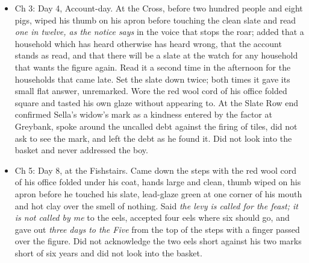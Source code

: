 \documentclass{design/chronicle}
\begin{document}
{
\begin{itemize}[leftmargin=1.4em,itemsep=1pt,topsep=3pt,parsep=0pt]

\item Ch 3: Day 4, Account-day. At the Cross, before two hundred people and eight pigs, wiped his thumb on his apron before touching the clean slate and read \emph{one in twelve, as the notice says} in the voice that stops the roar; added that a household which has heard otherwise has heard wrong, that the account stands as read, and that there will be a slate at the watch for any household that wants the figure again. Read it a second time in the afternoon for the households that came late. Set the slate down twice; both times it gave its small flat answer, unremarked. Wore the red wool cord of his office folded square and tasted his own glaze without appearing to. At the Slate Row end confirmed Sella’s widow’s mark as a kindness entered by the factor at Greybank, spoke around the uncalled debt against the firing of tiles, did not ask to see the mark, and left the debt as he found it. Did not look into the basket and never addressed the boy.

\end{itemize}

\begin{itemize}[leftmargin=1.4em,itemsep=1pt,topsep=3pt,parsep=0pt]

\item Ch 5: Day 8, at the Fishstairs. Came down the steps with the red wool cord of his office folded under his coat, hands large and clean, thumb wiped on his apron before he touched his slate, lead-glaze green at one corner of his mouth and hot clay over the smell of nothing. Said \emph{the levy is called for the feast; it is not called by me} to the eels, accepted four eels where six should go, and gave out \emph{three days to the Five} from the top of the steps with a finger passed over the figure. Did not acknowledge the two eels short against his two marks short of six years and did not look into the basket.

\end{itemize}

\begin{itemize}[leftmargin=1.4em,itemsep=1pt,topsep=3pt,parsep=0pt]


\end{itemize}}
\end{document}
